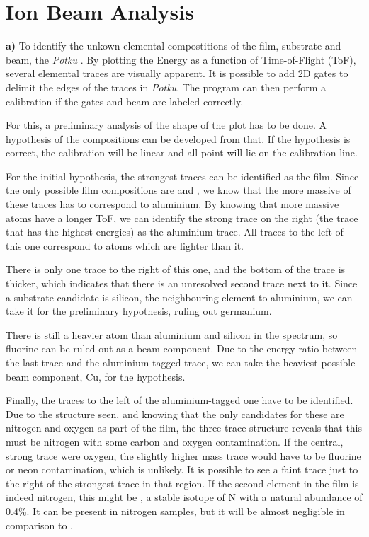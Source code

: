 \section{Ion Beam Analysis}
\textbf{a)} To identify the unkown elemental compostitions of the film, substrate and beam, the \textit{Potku} \cite{potku}. By plotting the Energy as a function of Time-of-Flight (ToF), several elemental traces are visually apparent. It is possible to add 2D gates to delimit the edges of the traces in \textit{Potku}. The program can then perform a calibration if the gates and beam are labeled correctly. 

For this, a preliminary analysis of the shape of the plot has to be done. A hypothesis of the compositions can be developed from that. If the hypothesis is correct, the calibration will be linear and all point will lie on the calibration line. 

For the initial hypothesis, the strongest traces can be identified as the film. Since the only possible film compositions are  and , we know that the more massive of these traces has to correspond to aluminium. By knowing that more massive atoms have a longer ToF, we can identify the strong trace on the right (the trace that has the highest energies) as the aluminium trace. All traces to the left of this one correspond to atoms which are lighter than it. 

There is only one trace to the right of this one, and the bottom of the trace is thicker, which indicates that there is an unresolved second trace next to it. Since a substrate candidate is silicon, the neighbouring element to aluminium, we can take it for the preliminary hypothesis, ruling out germanium. 

There is still a heavier atom than aluminium and silicon in the spectrum, so fluorine can be ruled out as a beam component. Due to the energy ratio between the last trace and the aluminium-tagged trace, we can take the heaviest possible beam component, Cu, for the hypothesis.

Finally, the traces to the left of the aluminium-tagged one have to be identified. Due to the structure seen, and knowing that the only candidates for these are nitrogen and oxygen as part of the film, the three-trace structure reveals that this must be nitrogen with some carbon and oxygen contamination. If the central, strong trace were oxygen, the slightly higher mass trace would have to be fluorine or neon contamination, which is unlikely. It is possible to see a faint trace just to the right of the strongest trace in that region. If the second element in the film is indeed nitrogen, this might be , a stable isotope of N with a natural abundance of 0.4\%. It can be present in nitrogen samples, but it will be almost negligible in comparison to .


